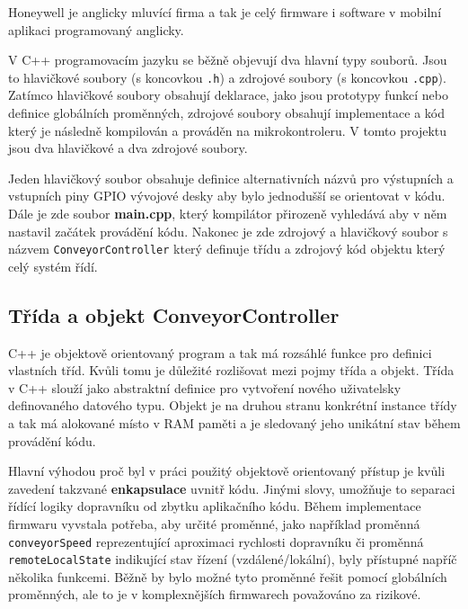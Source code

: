 Honeywell je anglicky mluvící firma a tak je celý firmware i software v mobilní aplikaci programovaný anglicky.

V C++ programovacím jazyku se běžně objevují dva hlavní typy souborů. Jsou to hlavičkové soubory (s koncovkou \texttt{.h}) a zdrojové soubory (s koncovkou \texttt{.cpp}). Zatímco hlavičkové soubory obsahují deklarace, jako jsou prototypy funkcí nebo definice globálních proměnných, zdrojové soubory obsahují implementace a kód který je následně kompilován a prováděn na mikrokontroleru. V tomto projektu jsou dva hlavičkové a dva zdrojové soubory.

Jeden hlavičkový soubor obsahuje definice alternativních názvů pro výstupních a vstupních piny GPIO vývojové desky aby bylo jednodušší se orientovat v kódu. Dále je zde soubor \textbf{main.cpp}, který kompilátor přirozeně vyhledává aby v něm nastavil začátek provádění kódu. Nakonec je zde zdrojový a hlavičkový soubor s názvem \texttt{ConveyorController} který definuje třídu a zdrojový kód objektu který celý systém řídí.

\subsection{Třída a objekt ConveyorController}\label{sec:ConveyorController}

C++ je objektově orientovaný program a tak má rozsáhlé funkce pro definici vlastních tříd. Kvůli tomu je důležité rozlišovat mezi pojmy třída a objekt. Třída v C++ slouží jako abstraktní definice pro vytvoření nového uživatelsky definovaného datového typu. Objekt je na druhou stranu konkrétní instance třídy a tak má alokované místo v RAM paměti a je sledovaný jeho unikátní stav během provádění kódu.
\cite{CppObjectAndClassArticle}

Hlavní výhodou proč byl v práci použitý objektově orientovaný přístup je kvůli zavedení takzvané \textbf{enkapsulace} uvnitř kódu. Jinými slovy, umožňuje to separaci řídící logiky dopravníku od zbytku aplikačního kódu. Během implementace firmwaru vyvstala potřeba, aby určité proměnné, jako například proměnná \texttt{conveyorSpeed} reprezentující aproximaci rychlosti dopravníku či proměnná \texttt{remoteLocalState} indikující stav řízení (vzdálené/lokální), byly přístupné napříč několika funkcemi. Běžně by bylo možné tyto proměnné řešit pomocí globálních proměnných, ale to je v komplexnějších firmwarech považováno za rizikové.
\cite{EnkapsulaceVCppArikl}

